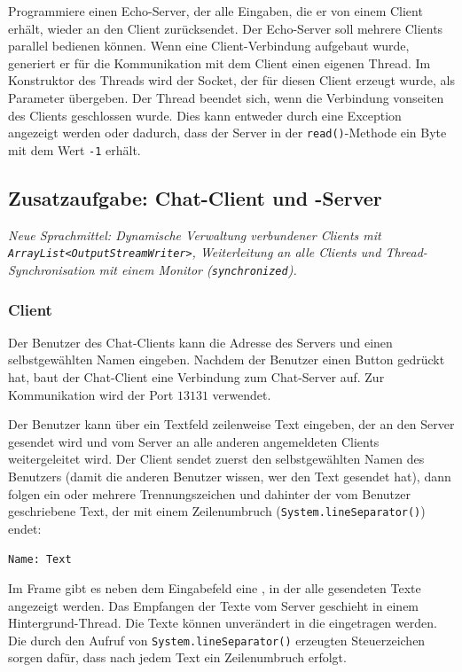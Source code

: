 Programmiere einen Echo-Server, der alle Eingaben, die er von einem Client
erhält, wieder an den Client zurücksendet. Der Echo-Server soll mehrere
Clients parallel bedienen können. Wenn eine Client-Verbindung aufgebaut wurde,
generiert er für die Kommunikation mit dem Client einen eigenen Thread. Im
Konstruktor des Threads wird der Socket, der für diesen Client erzeugt wurde,
als Parameter übergeben. Der Thread beendet sich, wenn die Verbindung vonseiten
des Clients geschlossen wurde. Dies kann entweder durch eine Exception
angezeigt werden oder dadurch, dass der Server in der \lstinline|read()|-Methode
ein Byte mit dem Wert \lstinline|-1| erhält.


\subsection{Zusatzaufgabe: Chat-Client und -Server \tagZusatz}
\noindent \emph{Neue Sprachmittel: Dynamische Verwaltung verbundener Clients mit \texttt{ArrayList<OutputStreamWriter>}, Weiterleitung an alle Clients und Thread-Synchronisation mit einem Monitor (\texttt{synchronized}).}

\subsubsection{Client}

Der Benutzer des Chat-Clients kann die Adresse des Servers und einen
selbstgewählten Namen eingeben. Nachdem der Benutzer einen Button gedrückt hat, baut
der Chat-Client eine Verbindung zum Chat-Server auf. Zur Kommunikation wird der 
Port $13131$ verwendet.

Der Benutzer kann über ein Textfeld zeilenweise Text eingeben, der an den
Server gesendet wird und vom Server an alle anderen angemeldeten Clients
weitergeleitet wird. Der Client sendet zuerst den selbstgewählten Namen des Benutzers
(damit die anderen Benutzer wissen, wer den Text gesendet hat), dann folgen ein
oder mehrere Trennungszeichen und dahinter der vom Benutzer geschriebene Text,
der mit einem Zeilenumbruch (\lstinline|System.lineSeparator()|) endet:

\lstinline|Name: Text|

Im Frame gibt es neben dem Eingabefeld eine , in der alle
gesendeten Texte angezeigt werden. Das Empfangen der Texte vom Server geschieht
in einem Hintergrund-Thread. Die Texte können unverändert in die
 eingetragen werden. Die durch den Aufruf von
\lstinline|System.lineSeparator()| erzeugten Steuerzeichen sorgen dafür, dass
nach jedem Text ein Zeilenumbruch erfolgt.

